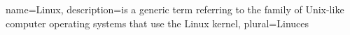 {
  name=Linux,
  description={is a generic term referring to the family of Unix-like
               computer operating systems that use the Linux kernel},
  plural=Linuces
}